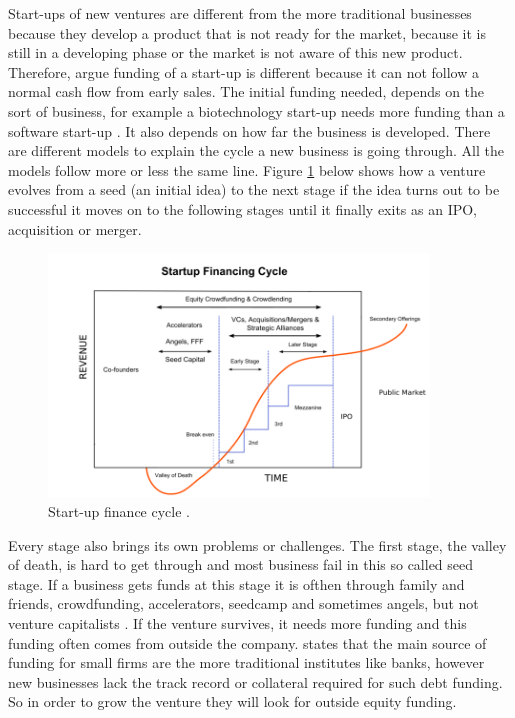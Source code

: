 \documentclass[a4paper, 11pt]{article}
\begin{document}
Start-ups of new ventures are different from the more traditional businesses because they develop a product that is not ready for the market, because it is still in a developing phase or the market is not aware of this new product. Therefore, \cite{TiddBessant} argue funding of a start-up is different because it can not follow a normal cash flow from early sales. The initial funding needed, depends on the sort of business, for example a biotechnology start-up needs more funding than a software start-up \citep{TiddBessant}. It also depends on how far the business is developed. There are different models to explain the cycle a new business is going through. All the models follow more or less the same line. Figure \ref{fig:graph1} below shows how a venture evolves from a seed (an initial idea) to the next stage if the idea turns out to be successful it moves on to the following stages until it finally exits as an IPO, acquisition or merger.

\begin{figure}[h!]
    \centering
    \includegraphics[width=0.9\textwidth]{FinCycle.png}
    \caption{Start-up finance cycle \citep{wiki}.}
    \label{fig:graph1}
\end{figure}

Every stage also brings its own problems or challenges. The first stage, the valley of death, is hard to get through and most business fail in this so called seed stage. If a business gets funds at this stage it is ofthen through family and friends, crowdfunding, accelerators, seedcamp and sometimes angels, but not venture capitalists \citep{TiddBessant}. If the venture survives, it needs more funding and this funding often comes from outside the company. \cite{casson2008oxford} states that the main source of funding for small firms are the more traditional institutes like banks, however new businesses lack the track record or collateral required for such debt funding. So in order to grow the venture they will look for outside equity funding.
\end{document}
